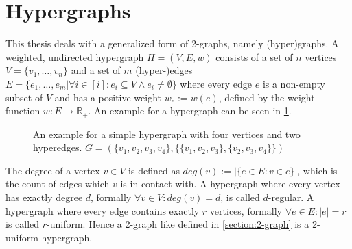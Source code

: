 \section{Hypergraphs} \label{section:hypergraphs}
This thesis deals with a generalized form of 2-graphs, namely (hyper)graphs.
A weighted, undirected hypergraph $H = (V, E, w)$ consists of a set of $n$ vertices $V = \{v_1, \ldots, v_n\}$ and a set of $m$ (hyper-)edges $E = \{ e_1, \ldots , e_m | \forall i \in [i]: e_i \subseteq V \land e_i \neq \emptyset \} $ where every edge $e$ is a non-empty subset of $V$ and has a positive weight $w_e:= w(e) $, defined by the weight function $w: E \to  \mathbb{R}_+ $. An example for a hypergraph can be seen in \cref{fig:exapmlehypergraph}.



	
\begin{figure} [htpb]
	\centering
	\caption[Example hypergraph]{An example for a simple hypergraph with four vertices and two hyperedges. $G=(\{v_1, v_2, v_3, v_4\},\{\{v_1, v_2, v_3\}, \{v_2,v_3, v_4\}\} )$}\label{fig:exapmlehypergraph}
\end{figure}


The degree of a vertex $v\in V$ is defined as $deg(v) := |\{e\in E: v\in e\}|$, which is the count of edges which $v$ is in contact with.
A hypergraph where every vertex has exactly degree $d$, formally $\forall v\in V : deg(v) =d $,  is called $d$-regular.
A hypergraph where every edge contains exactly $r$ vertices, formally $\forall e\in E : |e| =r $ is called $r$-uniform. Hence a 2-graph like defined in \cref{section:2-graph} is a 2-uniform hypergraph.

